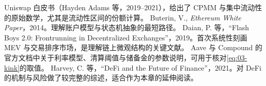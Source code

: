 \begin{furtherreading}
   Uniswap 白皮书（Hayden Adams 等，2019--2021），给出了 CPMM 与集中流动性的原始数学，尤其是流动性区间的份额计算。
   Buterin, V., \emph{Ethereum White Paper}，2014。理解账户模型与状态机抽象的最短路径。
   Daian, P. 等，``Flash Boys 2.0: Frontrunning in Decentralized Exchanges''，2019。首次系统性刻画 MEV 与交易排序市场，是理解链上微观结构的关键文献。
   Aave 与 Compound 的官方文档中关于利率模型、清算阈值与储备金的参数说明，可用于核对\cref{eq:03-kink}的取值。
   Harvey, C. 等，``DeFi and the Future of Finance''，2021。对 DeFi 的机制与风险做了较完整的综述，适合作为本章的延伸阅读。
\end{furtherreading}

